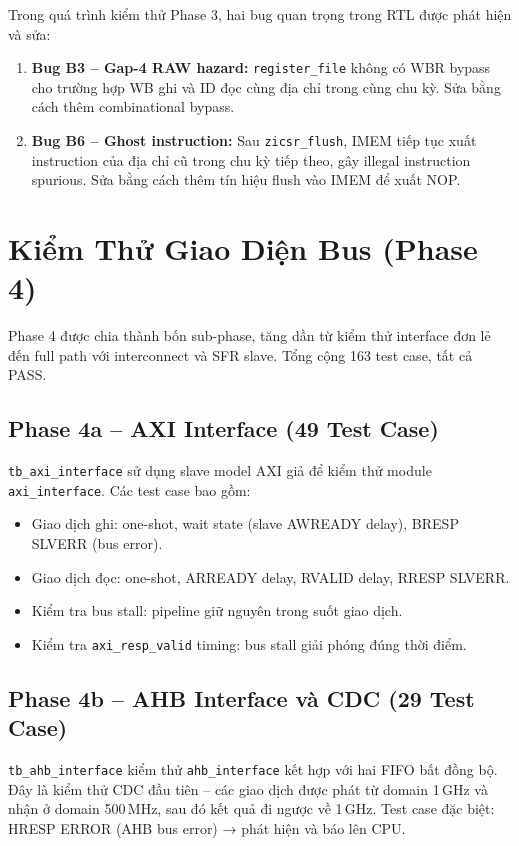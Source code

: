 Trong quá trình kiểm thử Phase 3, hai bug quan trọng trong RTL được phát hiện và sửa:

\begin{enumerate}
    \item \textbf{Bug B3 -- Gap-4 RAW hazard:} \texttt{register\_file} không có WBR bypass cho trường hợp WB ghi và ID đọc cùng địa chỉ trong cùng chu kỳ. Sửa bằng cách thêm combinational bypass.
    \item \textbf{Bug B6 -- Ghost instruction:} Sau \texttt{zicsr\_flush}, IMEM tiếp tục xuất instruction của địa chỉ cũ trong chu kỳ tiếp theo, gây illegal instruction spurious. Sửa bằng cách thêm tín hiệu flush vào IMEM để xuất NOP.
\end{enumerate}

\section{Kiểm Thử Giao Diện Bus (Phase 4)}

Phase 4 được chia thành bốn sub-phase, tăng dần từ kiểm thử interface đơn lẻ đến full path với interconnect và SFR slave. Tổng cộng 163 test case, tất cả PASS.

\subsection{Phase 4a -- AXI Interface (49 Test Case)}

\texttt{tb\_axi\_interface} sử dụng slave model AXI giả để kiểm thử module \texttt{axi\_interface}. Các test case bao gồm:

\begin{itemize}
    \item Giao dịch ghi: one-shot, wait state (slave AWREADY delay), BRESP SLVERR (bus error).
    \item Giao dịch đọc: one-shot, ARREADY delay, RVALID delay, RRESP SLVERR.
    \item Kiểm tra bus stall: pipeline giữ nguyên trong suốt giao dịch.
    \item Kiểm tra \texttt{axi\_resp\_valid} timing: bus stall giải phóng đúng thời điểm.
\end{itemize}

\subsection{Phase 4b -- AHB Interface và CDC (29 Test Case)}

\texttt{tb\_ahb\_interface} kiểm thử \texttt{ahb\_interface} kết hợp với hai FIFO bất đồng bộ. Đây là kiểm thử CDC đầu tiên -- các giao dịch được phát từ domain 1\,GHz và nhận ở domain 500\,MHz, sau đó kết quả đi ngược về 1\,GHz. Test case đặc biệt: HRESP ERROR (AHB bus error) → phát hiện và báo lên CPU.

